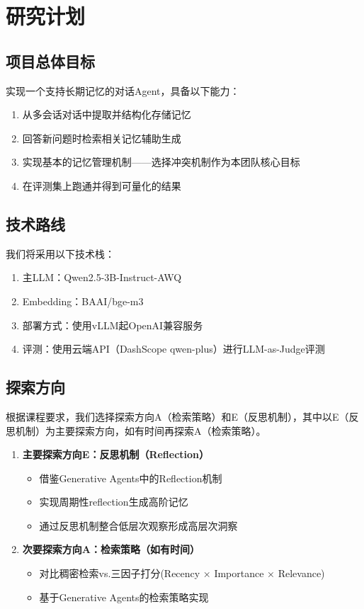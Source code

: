 \documentclass[11pt]{article}
\begin{document}
\section{研究计划}

\subsection{项目总体目标}

实现一个支持长期记忆的对话Agent，具备以下能力：

\begin{enumerate}
\item 从多会话对话中提取并结构化存储记忆
\item 回答新问题时检索相关记忆辅助生成
\item 实现基本的记忆管理机制——选择冲突机制作为本团队核心目标
\item 在评测集上跑通并得到可量化的结果
\end{enumerate}

\subsection{技术路线}

我们将采用以下技术栈：

\begin{enumerate}
\item 主LLM：Qwen2.5-3B-Instruct-AWQ
\item Embedding：BAAI/bge-m3
\item 部署方式：使用vLLM起OpenAI兼容服务
\item 评测：使用云端API（DashScope qwen-plus）进行LLM-as-Judge评测
\end{enumerate}

\subsection{探索方向}

根据课程要求，我们选择探索方向A（检索策略）和E（反思机制），其中以E（反思机制）为主要探索方向，如有时间再探索A（检索策略）。

\begin{enumerate}
\item \textbf{主要探索方向E：反思机制（Reflection）}
\begin{itemize}
\item 借鉴Generative Agents中的Reflection机制
\item 实现周期性reflection生成高阶记忆
\item 通过反思机制整合低层次观察形成高层次洞察
\end{itemize}

\item \textbf{次要探索方向A：检索策略（如有时间）}
\begin{itemize}
\item 对比稠密检索vs.三因子打分(Recency × Importance × Relevance)
\item 基于Generative Agents的检索策略实现
\end{itemize}
\end{enumerate}
\end{document}
